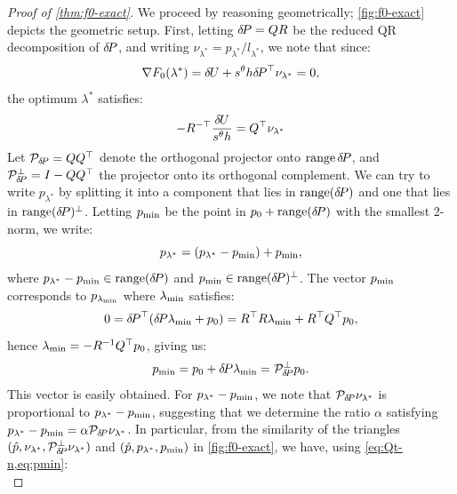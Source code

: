 \documentclass{article}
\begin{document}
\begin{proof}[Proof of \cref{thm:f0-exact}]
  We proceed by reasoning geometrically; \cref{fig:f0-exact} depicts
  the geometric setup. First, letting ${\delta \hspace{-0.14em} P} = QR$ be the reduced
  QR decomposition of ${\delta \hspace{-0.14em} P}$, and writing
  $\nu_{\lambda^*} = p_{\lambda^*}/l_{\lambda^*}$, we note that since:
  \begin{equation}
    \nabla F_0(\lambda^*) = {\delta \hspace{-0.09em} U} + s^\theta h {\delta \hspace{-0.14em} P}^\top \nu_{\lambda^*} = 0,
  \end{equation}
  the optimum $\lambda^*$ satisfies:
  \begin{equation}\label{eq:Qt-n}
    - R^{-\top} \frac{{\delta \hspace{-0.09em} U}}{s^\theta h} = Q^\top \nu_{\lambda^*}
  \end{equation}
  Let $\mathcal{P}_{{\delta \hspace{-0.14em} P}} = QQ^\top$ denote the orthogonal
  projector onto $\operatorname{range} {\delta \hspace{-0.14em} P}$, and
  $\mathcal{P}^\perp_{{\delta \hspace{-0.14em} P}} = I - QQ^\top$ the projector onto its
  orthogonal complement. We can try to write $p_{\lambda^*}$ by
  splitting it into a component that lies in $\operatorname{range}({\delta \hspace{-0.14em} P})$ and
  one that lies in $\operatorname{range}({\delta \hspace{-0.14em} P})^\perp$. Letting $p_{\operatorname{min}}$ be the
  point in $p_0 + \operatorname{range}({\delta \hspace{-0.14em} P})$ with the smallest 2-norm, we
  write:
  \begin{equation}\label{eq:plam-decomp}
    p_{\lambda^*} = (p_{\lambda^*} - p_{\operatorname{min}}) + p_{\operatorname{min}},
  \end{equation}
  where $p_{\lambda^*} - p_{\operatorname{min}} \in \operatorname{range}({\delta \hspace{-0.14em} P})$ and
  $p_{\operatorname{min}} \in \operatorname{range}({\delta \hspace{-0.14em} P})^\perp$. The vector $p_{\operatorname{min}}$ corresponds to
  $p_{\lambda_{\operatorname{min}}}$ where $\lambda_{\operatorname{min}}$ satisfies:
  \begin{equation}
    0 = {\delta \hspace{-0.14em} P}^\top ({\delta \hspace{-0.14em} P} \lambda_{\operatorname{min}} + p_0) = R^\top R \lambda_{\operatorname{min}} + R^\top Q^\top p_0,
  \end{equation}
  hence $\lambda_{\operatorname{min}} = -R^{-1} Q^\top p_0$, giving us:
  \begin{equation}\label{eq:pmin}
    p_{\operatorname{min}} = p_0 + {\delta \hspace{-0.14em} P} \lambda_{\operatorname{min}} = \mathcal{P}^\perp_{{\delta \hspace{-0.14em} P}} p_0.
  \end{equation}
  This vector is easily obtained. For $p_{\lambda^*} - p_{\operatorname{min}}$, we note
  that $\mathcal{P}_{{\delta \hspace{-0.14em} P}} \nu_{\lambda^*}$ is proportional to
  $p_{\lambda^*} - p_{\operatorname{min}}$, suggesting that we determine the ratio
  $\alpha$ satisfying
  $p_{\lambda^*} - p_{\operatorname{min}} = \alpha \mathcal{P}_{{\delta \hspace{-0.14em} P}}
  \nu_{\lambda^*}$. In particular, from the similarity of the
  triangles
  $(\hat{p}, \nu_{\lambda^*}, \mathcal{P}^\perp_{{\delta \hspace{-0.14em} P}}
  \nu_{\lambda^*})$ and $(\hat{p}, p_{\lambda^*}, p_{\operatorname{min}})$ in
  \cref{fig:f0-exact}, we have, using \cref{eq:Qt-n,eq:pmin}:
  \begin{equation}\label{eq:alpha-solve}

\end{equation}
\end{proof}
\end{document}

